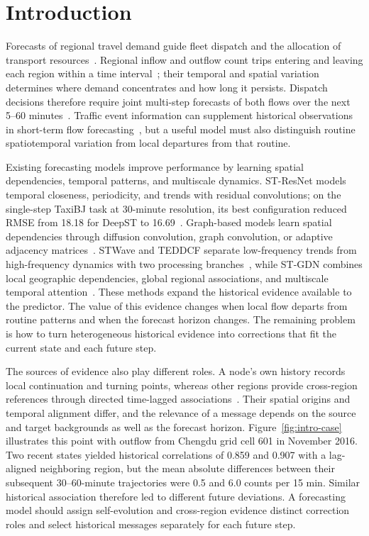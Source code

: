 
\section{Introduction}\label{sec:introduction}

Forecasts of regional travel demand guide fleet dispatch and the allocation of transport resources~\cite{ref44}. Regional inflow and outflow count trips entering and leaving each region within a time interval~\cite{ref36}; their temporal and spatial variation determines where demand concentrates and how long it persists. Dispatch decisions therefore require joint multi-step forecasts of both flows over the next 5--60 minutes~\cite{ref27,ref43}. Traffic event information can supplement historical observations in short-term flow forecasting~\cite{ref42}, but a useful model must also distinguish routine spatiotemporal variation from local departures from that routine.

Existing forecasting models improve performance by learning spatial dependencies, temporal patterns, and multiscale dynamics. ST-ResNet models temporal closeness, periodicity, and trends with residual convolutions; on the single-step TaxiBJ task at 30-minute resolution, its best configuration reduced RMSE from 18.18 for DeepST to 16.69~\cite{ref14}. Graph-based models learn spatial dependencies through diffusion convolution, graph convolution, or adaptive adjacency matrices~\cite{ref01,ref02,ref03}. STWave and TEDDCF separate low-frequency trends from high-frequency dynamics with two processing branches~\cite{ref11,ref18}, while ST-GDN combines local geographic dependencies, global regional associations, and multiscale temporal attention~\cite{ref41}. These methods expand the historical evidence available to the predictor. The value of this evidence changes when local flow departs from routine patterns and when the forecast horizon changes. The remaining problem is how to turn heterogeneous historical evidence into corrections that fit the current state and each future step.

The sources of evidence also play different roles. A node's own history records local continuation and turning points, whereas other regions provide cross-region references through directed time-lagged associations~\cite{ref47}. Their spatial origins and temporal alignment differ, and the relevance of a message depends on the source and target backgrounds as well as the forecast horizon. Figure~\ref{fig:intro-case} illustrates this point with outflow from Chengdu grid cell 601 in November 2016. Two recent states yielded historical correlations of 0.859 and 0.907 with a lag-aligned neighboring region, but the mean absolute differences between their subsequent 30--60-minute trajectories were 0.5 and 6.0 counts per 15 min. Similar historical association therefore led to different future deviations. A forecasting model should assign self-evolution and cross-region evidence distinct correction roles and select historical messages separately for each future step.

